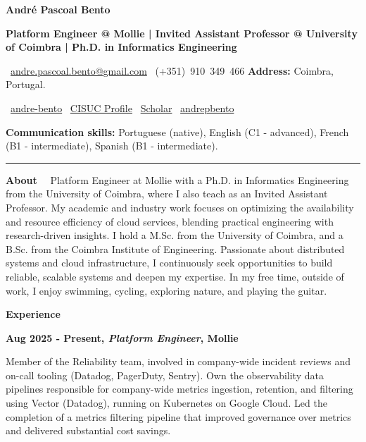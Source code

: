 \documentclass[a4paper,9pt]{memoir}
\newcommand{\cvheading}[1]{{\huge\bfseries\color{RoyalBlue} #1}} %
\newcommand{\cvsubheading}[1]{{\large\bfseries #1} \bigbreak} %
\newcommand{\Sep}{\vspace{1em}} %
\newcommand{\SmallSep}{\vspace{0.5em}} %
\newcommand{\aboutme}[2]{ %
    \textbf{\color{RoyalBlue} #1}~~#2\par\Sep
}
\newcommand{\CVSection}[1]{ %
    {\Large\textbf{#1}}\par
    \SmallSep %
}
\newcommand{\CVItem}[2]{ %
    \textbf{\color{RoyalBlue} #1}\par
    #2
    \SmallSep %
}
\begin{document}
\begin{center}
    \cvheading{\textbf{André Pascoal Bento}}

    \cvsubheading{\Large Platform Engineer @ Mollie | Invited Assistant Professor @ University of Coimbra | Ph.D. in Informatics Engineering}
    
    \faEnvelope~\href{mailto:andre.pascoal.bento@gmail.com}{andre.pascoal.bento@gmail.com} \quad
    \faPhone~(+351)~910~349~466 \quad
    \textbf{Address:} Coimbra, Portugal.

    \faLinkedin~\href{https://www.linkedin.com/in/andre-bento/?locale=en_US}{andre-bento} \quad
    \faGlobe~\href{https://www.cisuc.uc.pt/en/people/apbento}{CISUC Profile} \quad
    \faGoogle~\href{https://scholar.google.com/citations?user=9Yl9gBwAAAAJ&hl=en}{Scholar} \quad
    \faGithub~\href{https://github.com/andrepbento}{andrepbento}

    \textbf{Communication skills:}
    Portuguese (native),
    English (C1 - advanced),
    French (B1 - intermediate),
    Spanish (B1 - intermediate).
    
    \noindent\rule{\linewidth}{0.4pt}
\end{center}


\aboutme{About}{%
Platform Engineer at Mollie with a Ph.D. in Informatics Engineering from the University of Coimbra, where I also teach as an Invited Assistant Professor. My academic and industry work focuses on optimizing the availability and resource efficiency of cloud services, blending practical engineering with research-driven insights.
I hold a M.Sc. from the University of Coimbra, and a B.Sc. from the Coimbra Institute of Engineering. Passionate about distributed systems and cloud infrastructure, I continuously seek opportunities to build reliable, scalable systems and deepen my expertise.
In my free time, outside of work, I enjoy swimming, cycling, exploring nature, and playing the guitar.
}

\CVSection{Experience}

\CVItem{Aug 2025 - Present, \textit{Platform Engineer}, Mollie}{
    Member of the Reliability team, involved in company-wide incident reviews and on-call tooling (Datadog, PagerDuty, Sentry). Own the observability data pipelines responsible for company-wide metrics ingestion, retention, and filtering using Vector (Datadog), running on Kubernetes on Google Cloud. Led the completion of a metrics filtering pipeline that improved governance over metrics and delivered substantial cost savings.
}
\end{document}
